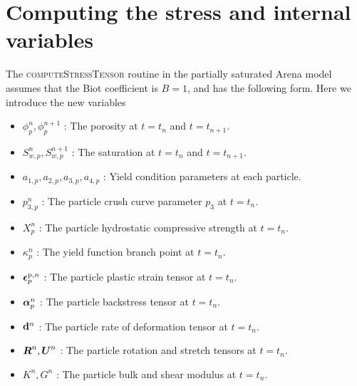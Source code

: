 \section{Computing the stress and internal variables}
The \textsc{computeStressTensor} routine in the partially saturated Arena model assumes
that the Biot coefficient is $B = 1$, and has the following form.  Here we introduce the new variables
\begin{itemize} 
  \setlength\itemsep{1pt}
  \item $\phi_p^n, \phi_p^{n+1}$ : {\Ochre The porosity at $t = t_n$ and $t = t_{n+1}$.}
  \item $S_{w,p}^n, S_{w,p}^{n+1}$ : {\Ochre The saturation at $t = t_n$ and $t = t_{n+1}$.}
  \item $a_{1,p}, a_{2,p}, a_{3,p}, a_{4,p}$ : {\Ochre Yield condition parameters at each particle.}
  \item $p^n_{3,p}$ : {\Ochre The particle crush curve parameter $p_3$ at $t = t_n$.}
  \item $X_p^n$ : {\Ochre The particle hydrostatic compressive strength at $t = t_n$.}
  \item $\kappa_p^n$ : {\Ochre The yield function branch point at $t = t_n$.}
  \item $\boldsymbol{\epsilon}_{p}^{\text{p},n}$ : {\Ochre The particle plastic strain tensor at $t = t_n$.}
  \item $\boldsymbol{\alpha}_{p}^{n}$ : {\Ochre The particle backstress tensor at $t = t_n$.}
  \item $\mathbf{d}^{n}$ : {\Ochre The particle rate of deformation tensor at $t = t_n$.}
  \item $\boldsymbol{R}^{n}, \boldsymbol{U}^n$ : {\Ochre The particle rotation and stretch tensors at $t = t_n$.}
  \item $K^{n}, G^n$ : {\Ochre The particle bulk and shear modulus at $t = t_n$.}
\end{itemize}
